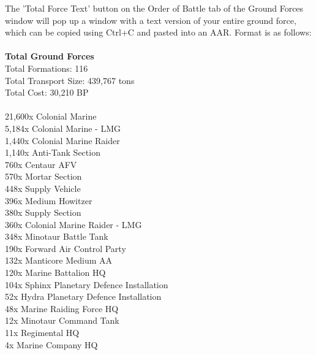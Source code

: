 \documentclass[../../Aurora C# unofficial manual.tex]{subfiles}
\begin{document}
	The 'Total Force Text' button on the Order of Battle tab of the Ground Forces window will pop up a window with a text version of your entire ground force, which can be copied using Ctrl+C and pasted into an AAR. Format is as follows:\\\\
	\textbf{Total Ground Forces}\\
	Total Formations: 116\\
	Total Transport Size: 439,767 tons\\
	Total Cost: 30,210 BP\\\\
	21,600x Colonial Marine\\
	5,184x Colonial Marine - LMG\\
	1,440x Colonial Marine Raider\\
	1,140x Anti-Tank Section\\
	760x Centaur AFV\\
	570x Mortar Section\\
	448x Supply Vehicle\\
	396x Medium Howitzer\\
	380x Supply Section\\
	360x Colonial Marine Raider - LMG\\
	348x Minotaur Battle Tank\\
	190x Forward Air Control Party\\
	132x Manticore Medium AA\\
	120x Marine Battalion HQ\\
	104x Sphinx Planetary Defence Installation\\
	52x Hydra Planetary Defence Installation\\
	48x Marine Raiding Force HQ\\
	12x Minotaur Command Tank\\
	11x Regimental HQ\\
	4x Marine Company HQ
\end{document}

